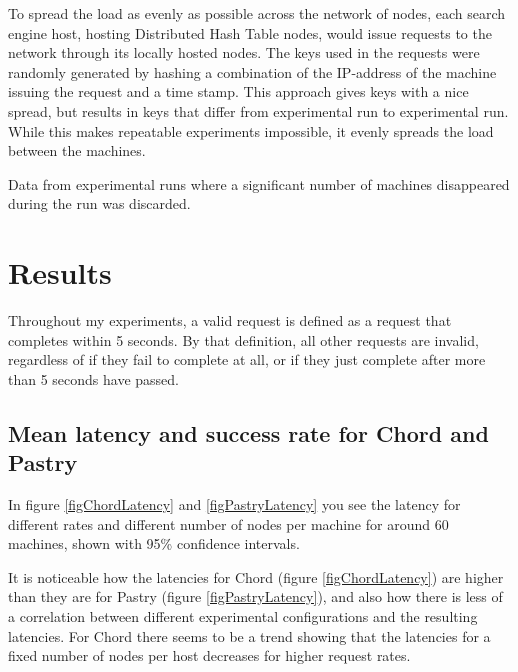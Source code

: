To spread the load as evenly as possible across the network of nodes, each search engine host, hosting Distributed Hash Table nodes, would issue requests to the network through its locally hosted nodes.
The keys used in the requests were randomly generated by hashing a combination of the IP-address of the machine issuing the request and a time stamp. This approach gives keys with a nice spread, but results in keys that differ from experimental run to experimental run. While this makes repeatable experiments impossible, it evenly spreads the load between the machines.

Data from experimental runs where a significant number of machines disappeared during the run was discarded.


\section{Results}
Throughout my experiments, a valid request is defined as a request that completes within 5 seconds. By that definition, all other requests are invalid, regardless of if they fail to complete at all, or if they just complete after more than 5 seconds have passed.

\subsection{Mean latency and success rate for Chord and Pastry}
In figure \ref{figChordLatency} and \ref{figPastryLatency} you see the latency for different rates and different number of nodes per machine for around 60 machines, shown with 95\% confidence intervals. 

It is noticeable how the latencies for Chord (figure \ref{figChordLatency}) are higher than they are for Pastry (figure \ref{figPastryLatency}), and also how there is less of a correlation between different experimental configurations and the resulting latencies.
For Chord there seems to be a trend showing that the latencies for a fixed number of nodes per host decreases for higher request rates.

